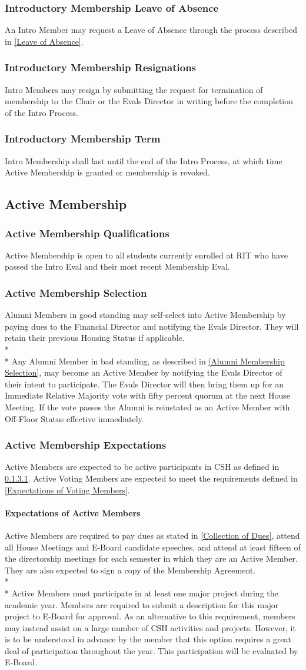 \documentclass{article}
\newcommand{\asection}[1]{\subsection{#1} \label{#1}}
\newcommand{\asubsection}[1]{\subsubsection{#1} \label{#1}}
\newcommand{\asubsubsection}[1]{\paragraph{#1} \label{#1}}
\begin{document}
\asubsection{Introductory Membership Leave of Absence}
An Intro Member may request a Leave of Absence through the process described in \ref{Leave of Absence}.

\asubsection{Introductory Membership Resignations}
Intro Members may resign by submitting the request for termination of membership to the Chair or the Evals Director in writing before the completion of the Intro Process.

\asubsection{Introductory Membership Term}
Intro Membership shall last until the end of the Intro Process, at which time Active Membership is granted or membership is revoked.

\asection{Active Membership}

\asubsection{Active Membership Qualifications}
Active Membership is open to all students currently enrolled at RIT who have passed the Intro Eval and their most recent Membership Eval.

\asubsection{Active Membership Selection}
Alumni Members in good standing may self-select into Active Membership by paying dues to the Financial Director and notifying the Evals Director. They will retain their previous Housing Status if applicable.
\\*\\*
Any Alumni Member in bad standing, as described in \ref{Alumni Membership Selection}, may become an Active Member by notifying the Evals Director of their intent to participate.
The Evals Director will then bring them up for an Immediate Relative Majority vote with fifty percent quorum at the next House Meeting.
If the vote passes the Alumni is reinstated as an Active Member with Off-Floor Status effective immediately.

\asubsection{Active Membership Expectations}
Active Members are expected to be active participants in CSH as defined in \ref{Expectations of Active Members}.
Active Voting Members are expected to meet the requirements defined in \ref{Expectations of Voting Members}.

\asubsubsection{Expectations of Active Members}
Active Members are required to pay dues as stated in \ref{Collection of Dues}, attend all House Meetings and E-Board candidate speeches, and attend at least fifteen of the directorship meetings for each semester in which they are an Active Member. They are also expected to sign a copy of the Membership Agreement.
\\* \\*
Active Members must participate in at least one major project during the academic year.
Members are required to submit a description for this major project to E-Board for approval.
As an alternative to this requirement, members may instead assist on a large number of CSH activities and projects.
However, it is to be understood in advance by the member that this option requires a great deal of participation throughout the year.
This participation will be evaluated by E-Board.
\end{document}
